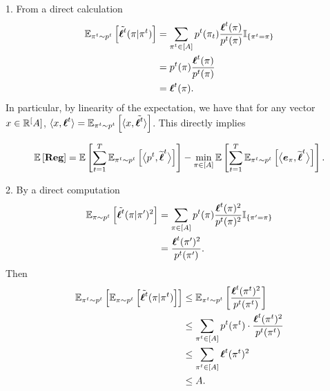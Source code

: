 \begin{solution}[]
1. From a direct calculation 
\begin{align*}
	\EEs{\ltt(\pi| \pi^t)}{\pi^t \sim p^t} &= \sum_{\pi^t\in [A]} p^t(\pi_t)
	\frac{\bsl^t(\pi)}{p^t(\pi)}\mathbb{I}_{\{ \pi^t =\pi \}}\\
					       &= p^t(\pi) \frac{\bsl^t(\pi)}{p^t(\pi)}\\
					       &= \bsl^t(\pi).
\end{align*}
In particular, by linearity of the expectation, we have that for any vector $ x \in \real ^[A] $, $ \siprod{x}{\bsl^t} =
\EEs{\siprod{x}{\ltt}}{\pi^t\sim p^t} $.
This directly implies 

\begin{equation*}
	\EE{\Reg} = \EE{\sum_{t=1}^T \EEs{\biprod{p^t}{\wt \bsl^t}}{\pi^t \sim p^t}}  -\min_{\pi \in
[A]}\EE{\sum_{t=1}^T\EEs{\biprod{\boldsymbol{e}_\pi}{\wt \bsl^t}}{\pi^t \sim p^t}}.
\end{equation*}

2. By a direct computation 
\begin{align*}
	\EEs{\ltt(\pi|\pi ')^2}{\pi\sim p^t} &= \sum_{\pi \in [A]} p^t(\pi) \frac{\bsl^t(\pi)^2}{p^t(\pi)^2} \mathbb{I}_{\{
	\pi ' = \pi\}}\\
					   &= \frac{\bsl^t(\pi')^2}{p^t(\pi ')}.
\end{align*}
Then
\begin{align*}
	\EEs{\EEs{\ltt(\pi|\pi^t)}{\pi\sim p^t}}{\pi^{t} \sim p^t} &\leq \EEs{\frac{\bsl^t(\pi^t)^2}{p^t(\pi^t)}}{\pi^t \sim p^t}\\
								   &\leq \sum_{\pi^t \in [A]} p^t(\pi^t)\cdot
								   \frac{\bsl^t(\pi^t)^2}{p^t(\pi^t)}\\
								   &\leq \sum_{\pi^t\in [A]}\bsl^t(\pi^t)^2 \\
								   &\leq A.
\end{align*}


\end{solution}
